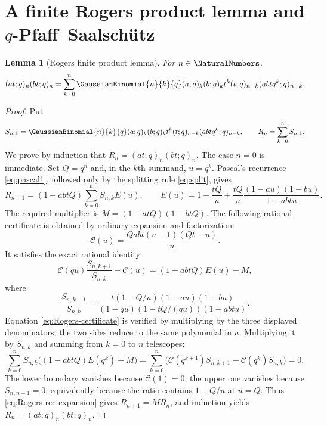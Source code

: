\documentclass[11pt]{article}
\numberwithin{equation}{section}
\newtheorem{lemma}[theorem]{Lemma}
\theoremstyle{definition}
\theoremstyle{remark}
\begin{document}
\section{A finite Rogers product lemma and $q$-Pfaff--Saalsch\"utz}

\begin{lemma}[Rogers finite product lemma]\label{lem:rogersfinite}
For $n\in\NaturalNumbers$,
\begin{equation}\label{eq:rogersfinite}
(at;q)_n(bt;q)_n
=\sum_{k=0}^n\GaussianBinomial{n}{k}{q}(a;q)_k(b;q)_k t^k
(t;q)_{n-k}(abtq^k;q)_{n-k}.
\end{equation}
\end{lemma}
\begin{proof}
Put
\[
S_{n,k}=\GaussianBinomial{n}{k}{q}(a;q)_k(b;q)_k t^k
(t;q)_{n-k}(abtq^k;q)_{n-k},
\qquad R_n=\sum_{k=0}^n S_{n,k}.
\]
We prove by induction that
$R_n=(at;q)_n(bt;q)_n$.  The case $n=0$ is immediate.  Set
$Q=q^n$ and, in the $k$th summand, $u=q^k$.  Pascal's recurrence
\eqref{eq:pascal1}, followed only by the splitting rule
\eqref{eq:split}, gives
\begin{equation}\label{eq:Rogers-rec-expansion}
R_{n+1}=(1-abtQ)\sum_{k=0}^n S_{n,k}E(u),
\qquad
E(u)=1-\frac{tQ}{u}
+\frac{tQ}{u}\frac{(1-au)(1-bu)}{1-abtu}.
\end{equation}
The required multiplier is
$M=(1-atQ)(1-btQ)$.  The following rational certificate is obtained by
ordinary expansion and factorization:
\[
\mathcal C(u)=\frac{Q a b t \left(u - 1\right) \left(Q t - u\right)}{u}.
\]
It satisfies the exact rational identity
\begin{equation}\label{eq:Rogers-certificate}
\mathcal C(qu)\frac{S_{n,k+1}}{S_{n,k}}-\mathcal C(u)
=(1-abtQ)E(u)-M,
\end{equation}
where
\[
\frac{S_{n,k+1}}{S_{n,k}}
=\frac{t(1-Q/u)(1-au)(1-bu)}
{(1-qu)(1-tQ/(qu))(1-abtu)}.
\]
Equation \eqref{eq:Rogers-certificate} is verified by multiplying by the
three displayed denominators; the two sides reduce to the same polynomial in
$u$.  Multiplying it by $S_{n,k}$ and summing from $k=0$ to $n$ telescopes:
\[
\sum_{k=0}^n S_{n,k}\bigl((1-abtQ)E(q^k)-M\bigr)
=\sum_{k=0}^n
\bigl(\mathcal C(q^{k+1})S_{n,k+1}
      -\mathcal C(q^k)S_{n,k}\bigr)=0.
\]
The lower boundary vanishes because $\mathcal C(1)=0$; the upper one
vanishes because $S_{n,n+1}=0$, equivalently because the ratio contains
$1-Q/u$ at $u=Q$.  Thus \eqref{eq:Rogers-rec-expansion} gives
$R_{n+1}=MR_n$, and induction yields
$R_n=(at;q)_n(bt;q)_n$.
\end{proof}
\end{document}
